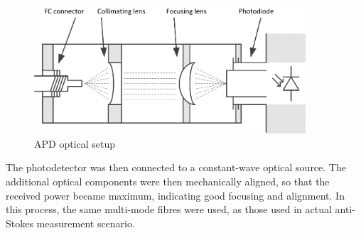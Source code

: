 \documentclass{standalone}
\begin{document}
\begin{figure}[h]
	\centering
	\includegraphics[width=0.9\textwidth]{apd_optics.png}
	\caption{APD optical setup}
	\label{fig:apd_optics}
\end{figure}
The photodetector was then connected to a constant-wave optical source. The additional optical components were then mechanically aligned, so that the received power became maximum, indicating good focusing and alignment. In this process, the same multi-mode fibres were used, as those used in actual anti-Stokes measurement scenario. \\
\end{document}
